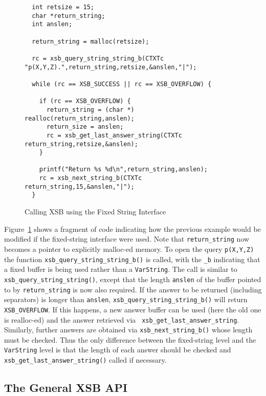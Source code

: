\begin{figure}[hbtp]
\begin{small}
\begin{verbatim}
  int retsize = 15;
  char *return_string;
  int anslen;

  return_string = malloc(retsize);

  rc = xsb_query_string_string_b(CTXTc "p(X,Y,Z).",return_string,retsize,&anslen,"|");

  while (rc == XSB_SUCCESS || rc == XSB_OVERFLOW) {
  
    if (rc == XSB_OVERFLOW) {
      return_string = (char *) realloc(return_string,anslen);
      return_size = anslen;
      rc = xsb_get_last_answer_string(CTXTc return_string,retsize,&anslen);
    }    

    printf("Return %s %d\n",return_string,anslen);
    rc = xsb_next_string_b(CTXTc return_string,15,&anslen,"|");
  }
\end{verbatim}
\end{small}
\caption{Calling XSB using the Fixed String Interface} \label{fig:fixedstringex}
\end{figure}

Figure~\ref{fig:fixedstringex} shows a fragment of code indicating how
the previous example would be modified if the fixed-string interface
were used.  Note that {\tt return\_string} now becomes a pointer to
explicitly malloc-ed memory.  To open the query {\tt p(X,Y,Z)} the
function {\tt xsb\_query\_string\_string\_b()} is called, with the
{\tt \_b} indicating that a fixed buffer is being used rather than a
{\tt VarString}.  The call is similar to {\tt
  xsb\_query\_string\_string()}, except that the length {\tt anslen}
of the buffer pointed to by {\tt return\_string} is now also required.
If the answer to be returned (including separators) is longer than
{\tt anslen}, {\tt xsb\_query\_string\_string\_b()} will return {\tt
  XSB\_OVERFLOW}.  If this happens, a new answer buffer can be used
(here the old one is realloc-ed) and the answer retrieved via {\tt
  xsb\_get\_last\_answer\_string}.  Similarly, further answers are
obtained via {\tt xsb\_next\_string\_b()} whose length must be
checked.  Thus the only difference between the fixed-string level and
the {\tt VarString} level is that the length of each answer should be
checked and {\tt xsb\_get\_last\_answer\_string()} called if
necessary.

\subsection{The General XSB API} \label{sec:CXSB}

